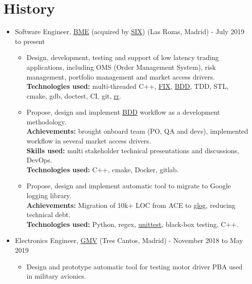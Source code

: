 \documentclass[11pt]{article}
\begin{document}
\section*{History}
\label{sec:org2248143}
\begin{itemize}
\item Software Engineer, \href{https://www.bolsasymercados.es/ing/Home}{BME} (acquired by \href{https://www.six-group.com/en/home.html}{SIX}) (Las Rozas, Madrid) - July 2019 to present\\
\begin{itemize}
\item Design, development, testing and support of low latency trading applications, including OMS (Order Management System), risk management, portfolio management and market access drivers.\\
\textbf{Technologies used:} multi-threaded C++, \href{https://www.investopedia.com/terms/f/financial-information-exchange.asp}{FIX}, \href{https://www.agilealliance.org/glossary/bdd/}{BDD}, TDD, STL, cmake, gdb, doctest, CI, git, \href{https://rr-project.org}{rr}.\\
\item Propose, design and implement  \href{https://www.agilealliance.org/glossary/bdd/}{BDD} workflow as a development methodology.\\
\textbf{Achievements:} brought onboard team (PO, QA and devs), implemented workflow in several market access drivers.\\
\textbf{Skills used:} multi stakeholder technical presentations and discussions, DevOps.\\
\textbf{Technologies used:} C++, cmake, Docker, gitlab.\\
\item Propose, design and implement automatic tool to migrate to Google logging library.\\
\textbf{Achievements:} Migration of 10k+ LOC from ACE to \href{https://github.com/google/glog}{glog}, reducing technical debt.\\
\textbf{Technologies used:} Python, regex, \href{https://docs.python.org/3/library/unittest.html}{unittest}, black-box testing, C++.\\
\end{itemize}
\item Electronics Engineer, \href{https://www.gmv.com/en/}{GMV} (Tres Cantos, Madrid) - November 2018 to May 2019\\
\begin{itemize}
\item Design and prototype automatic tool for testing motor driver PBA used in military avionics.\\

\end{itemize}
\end{itemize}
\end{document}
